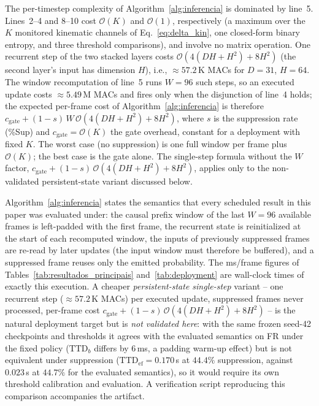 \documentclass[a4paper,fleqn]{cas-dc}
\begin{document}
{\color{\revcolor}The per-timestep complexity of Algorithm~\ref{alg:inferencia} is
dominated by line~5. Lines~2--4 and 8--10 cost $\mathcal{O}(K)$ and
$\mathcal{O}(1)$, respectively (a maximum over the $K$ monitored kinematic
channels of Eq.~\ref{eq:delta_kin}, one closed-form binary entropy, and three
threshold comparisons),
and involve no matrix operation. One recurrent step of the two stacked
layers costs $\mathcal{O}(4(DH{+}H^2)+8H^2)$ (the second layer's input has
dimension $H$), i.e., ${\approx}57.2$\,K MACs for $D{=}31$, $H{=}64$. The
window recomputation of line~5 runs $W{=}96$ such steps, so an executed
update costs ${\approx}5.49$\,M MACs and fires only when the disjunction of
line~4 holds; the expected per-frame cost of
Algorithm~\ref{alg:inferencia} is therefore $c_{\mathrm{gate}} +
(1-s)\,W\,\mathcal{O}(4(DH{+}H^2)+8H^2)$, where $s$ is the suppression rate
(\%Sup) and $c_{\mathrm{gate}} = \mathcal{O}(K)$ the gate overhead,
constant for a deployment with fixed $K$. The worst case (no suppression)
is one full window per frame plus $\mathcal{O}(K)$; the best case is the
gate alone. The single-step formula without the $W$ factor,
$c_{\mathrm{gate}} + (1-s)\,\mathcal{O}(4(DH{+}H^2)+8H^2)$, applies only to
the non-validated persistent-state variant discussed below.

Algorithm~\ref{alg:inferencia} states the semantics that every scheduled
result in this paper was evaluated under: the causal prefix window of the
last $W{=}96$ available frames is left-padded with the first frame, the
recurrent state is reinitialized at the start of each recomputed window, the
inputs of previously suppressed frames are re-read by later updates (the
input window must therefore be buffered), and a suppressed frame reuses only
the emitted probability. The ms/frame figures of
Tables~\ref{tab:resultados_principais}
and~\ref{tab:deployment} are wall-clock times of exactly this execution.
A cheaper \emph{persistent-state single-step} variant -- one recurrent step
(${\approx}57.2$\,K MACs) per executed update, suppressed frames never
processed, per-frame cost $c_{\mathrm{gate}} +
(1-s)\,\mathcal{O}(4(DH{+}H^2)+8H^2)$ -- is the natural deployment target
but is \emph{not validated here}: with the same frozen seed-42 checkpoints
and thresholds it agrees with the evaluated semantics on FR under the fixed
policy ($\mathrm{TTD}_b$ differs by $6$\,ms, a padding warm-up effect) but
is not equivalent under suppression ($\mathrm{TTD}_{\mathrm{ef}} =
0.170$\,s at $44.4\%$ suppression, against $0.023$\,s at $44.7\%$ for the
evaluated semantics), so it would require its own threshold calibration and
evaluation. A verification script reproducing this comparison accompanies
the artifact.}
\end{document}
